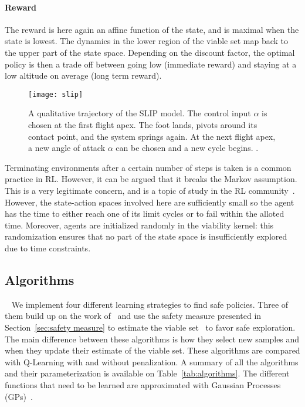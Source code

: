 \paragraph{Reward} The reward is here again an affine function of the state, and is maximal when the state is lowest. The dynamics in the lower region of the viable set map back to the upper part of the state space. Depending on the discount factor, the optimal policy is then a trade off between going low (immediate reward) and staying at a low altitude on average (long term reward).

\begin{figure}[t]
	\centering
	\texttt{[image: slip]}
	\caption{A qualitative trajectory of the SLIP model. The control input $\alpha$ is chosen at the first flight apex. The foot lands, pivots around its contact point, and the system springs again. At the next flight apex, a new angle of attack $\alpha$ can be chosen and a new cycle begins. .}
	\label{fig:slip motion phases}
\end{figure}

\begin{remark}
	Terminating environments after a certain number of steps is taken is a common practice in RL. However, it can be argued that it breaks the Markov assumption. This is a very legitimate concern, and is a topic of study in the RL community~\cite{pardo2018time}. However, the state-action spaces involved here are sufficiently small so the agent has the time to either reach one of its limit cycles or to fail within the alloted time. Moreover, agents are initialized randomly in the viability kernel: this randomization ensures that no part of the state space is insufficiently explored due to time constraints.
\end{remark}

\subsection{Algorithms}~\label{sec:algorithms}
We implement four different learning strategies to find safe policies. Three of them build up on the work of~\textcite{heim2020learnable} and use the safety measure presented in Section~\ref{sec:safety measure} to estimate the viable set \QV~to favor safe exploration. The main difference between these algorithms is how they select new samples and when they update their estimate of the viable set. These algorithms are compared with Q-Learning with and without penalization. A summary of all the algorithms and their parameterization is available on Table~\ref{tab:algorithms}. The different functions that need to be learned are approximated with Gaussian Processes (GPs)~\cite{williams2006gaussian}.

